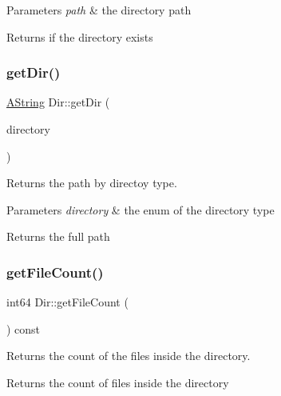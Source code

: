 \begin{DoxyParams}{Parameters}
{\em path} & the directory path \\
\hline
\end{DoxyParams}
\begin{DoxyReturn}{Returns}
if the directory exists 
\end{DoxyReturn}
\mbox{\label{class_dir_afa7ce6cd68c2ba64a8511d3480a198f6}} 
\subsubsection{\texorpdfstring{getDir()}{getDir()}}
{\footnotesize\ttfamily \mbox{\hyperlink{class_a_string}{A\+String}} Dir\+::get\+Dir (\begin{DoxyParamCaption}\item[{Directory}]{directory }\end{DoxyParamCaption})\hspace{0.3cm}{\ttfamily [static]}}



Returns the path by directoy type. 


\begin{DoxyParams}{Parameters}
{\em directory} & the enum of the directory type \\
\hline
\end{DoxyParams}
\begin{DoxyReturn}{Returns}
the full path 
\end{DoxyReturn}
\mbox{\label{class_dir_ae69556b4b4495ac7fe5854d1f025488e}} 
\subsubsection{\texorpdfstring{getFileCount()}{getFileCount()}}
{\footnotesize\ttfamily int64 Dir\+::get\+File\+Count (\begin{DoxyParamCaption}{ }\end{DoxyParamCaption}) const}



Returns the count of the files inside the directory. 

\begin{DoxyReturn}{Returns}
the count of files inside the directory 
\end{DoxyReturn}
\mbox{\label{class_dir_ae573871f2f0ff5ec00ff20e7dc2ab709}} 
